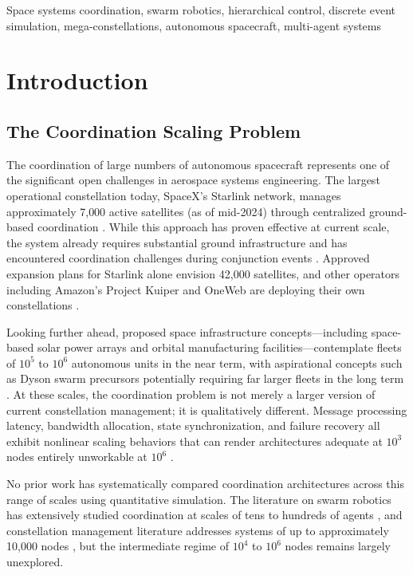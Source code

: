 \documentclass[journal]{IEEEtran}
\begin{document}
\begin{IEEEkeywords}
Space systems coordination, swarm robotics, hierarchical control, discrete event simulation, mega-constellations, autonomous spacecraft, multi-agent systems
\end{IEEEkeywords}

\section{Introduction}

\subsection{The Coordination Scaling Problem}

The coordination of large numbers of autonomous spacecraft represents one of the significant open challenges in aerospace systems engineering. The largest operational constellation today, SpaceX's Starlink network, manages approximately 7{,}000 active satellites (as of mid-2024) through centralized ground-based coordination \cite{starlink_ops}. While this approach has proven effective at current scale, the system already requires substantial ground infrastructure and has encountered coordination challenges during conjunction events \cite{esa_conjunction}. Approved expansion plans for Starlink alone envision 42{,}000 satellites, and other operators including Amazon's Project Kuiper and OneWeb are deploying their own constellations \cite{kuiper, oneweb_mgmt}.

Looking further ahead, proposed space infrastructure concepts---including space-based solar power arrays and orbital manufacturing facilities---contemplate fleets of $10^5$ to $10^6$ autonomous units in the near term, with aspirational concepts such as Dyson swarm precursors potentially requiring far larger fleets in the long term \cite{oneil_1976, badescu_2006}. At these scales, the coordination problem is not merely a larger version of current constellation management; it is qualitatively different. Message processing latency, bandwidth allocation, state synchronization, and failure recovery all exhibit nonlinear scaling behaviors that can render architectures adequate at $10^3$ nodes entirely unworkable at $10^6$ \cite{lynch_distributed}.

No prior work has systematically compared coordination architectures across this range of scales using quantitative simulation. The literature on swarm robotics has extensively studied coordination at scales of tens to hundreds of agents \cite{brambilla_2013}, and constellation management literature addresses systems of up to approximately 10{,}000 nodes \cite{wertz_smad}, but the intermediate regime of $10^4$ to $10^6$ nodes remains largely unexplored.
\end{document}
